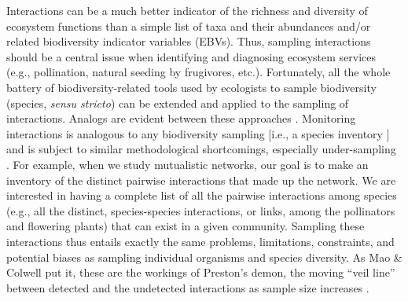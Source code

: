 \documentclass[12pt]{article}
\begin{document}
Interactions can be a much better indicator of the richness and diversity of ecosystem functions than a simple list of taxa and their abundances and\slash or related biodiversity indicator variables (EBVs). Thus, sampling interactions should be a central issue when identifying and diagnosing ecosystem services (e.g., pollination, natural seeding by frugivores, etc.). Fortunately, all the whole battery of biodiversity-related tools used by ecologists to sample biodiversity (species, \emph{sensu stricto}) can be extended and applied to the sampling of interactions. Analogs are evident between these approaches \citep{Colwell:2012fc}. Monitoring interactions is analogous to any biodiversity sampling [i.e., a species inventory \citet{E31/2562,Jordano:2009c}] and is subject to similar methodological shortcomings, especially under-sampling \citep{Coddington:2009fi,Vazquez:2009p82,Dorado:2011cf,RiveraHutinel:2012vn}. For example, when we study mutualistic networks, our goal is to make an inventory of the distinct pairwise interactions that made up the network. We are interested in having a complete list of all the pairwise interactions among species (e.g., all the distinct, species-species interactions, or links, among the pollinators and flowering plants) that can exist in a given community. Sampling these interactions thus entails exactly the same problems, limitations, constraints, and potential biases as sampling individual organisms and species diversity. As Mao \& Colwell \citep{Mao:2005tka} put it, these are the workings of Preston’s demon, the moving ``veil line'' between detected and the undetected interactions as sample size increases \citep{E2/813}.
\end{document}
